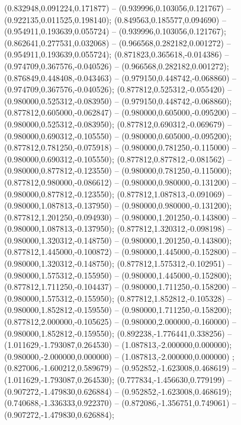  (0.832948,0.091224,0.171877) -- (0.939996,0.103056,0.121767) -- (0.922135,0.011525,0.198140);
 (0.849563,0.185577,0.094690) -- (0.954911,0.193639,0.055724) -- (0.939996,0.103056,0.121767);
 (0.862641,0.277531,0.032068) -- (0.966568,0.282182,0.001272) -- (0.954911,0.193639,0.055724);
 (0.871823,0.365618,-0.014386) -- (0.974709,0.367576,-0.040526) -- (0.966568,0.282182,0.001272);
 (0.876849,0.448408,-0.043463) -- (0.979150,0.448742,-0.068860) -- (0.974709,0.367576,-0.040526);
 (0.877812,0.525312,-0.055420) -- (0.980000,0.525312,-0.083950) -- (0.979150,0.448742,-0.068860);
 (0.877812,0.605000,-0.062847) -- (0.980000,0.605000,-0.095200) -- (0.980000,0.525312,-0.083950);
 (0.877812,0.690312,-0.069679) -- (0.980000,0.690312,-0.105550) -- (0.980000,0.605000,-0.095200);
 (0.877812,0.781250,-0.075918) -- (0.980000,0.781250,-0.115000) -- (0.980000,0.690312,-0.105550);
 (0.877812,0.877812,-0.081562) -- (0.980000,0.877812,-0.123550) -- (0.980000,0.781250,-0.115000);
 (0.877812,0.980000,-0.086612) -- (0.980000,0.980000,-0.131200) -- (0.980000,0.877812,-0.123550);
 (0.877812,1.087813,-0.091069) -- (0.980000,1.087813,-0.137950) -- (0.980000,0.980000,-0.131200);
 (0.877812,1.201250,-0.094930) -- (0.980000,1.201250,-0.143800) -- (0.980000,1.087813,-0.137950);
 (0.877812,1.320312,-0.098198) -- (0.980000,1.320312,-0.148750) -- (0.980000,1.201250,-0.143800);
 (0.877812,1.445000,-0.100872) -- (0.980000,1.445000,-0.152800) -- (0.980000,1.320312,-0.148750);
 (0.877812,1.575312,-0.102951) -- (0.980000,1.575312,-0.155950) -- (0.980000,1.445000,-0.152800);
 (0.877812,1.711250,-0.104437) -- (0.980000,1.711250,-0.158200) -- (0.980000,1.575312,-0.155950);
 (0.877812,1.852812,-0.105328) -- (0.980000,1.852812,-0.159550) -- (0.980000,1.711250,-0.158200);
 (0.877812,2.000000,-0.105625) -- (0.980000,2.000000,-0.160000) -- (0.980000,1.852812,-0.159550);
 (0.892238,-1.776441,0.338256) -- (1.011629,-1.793087,0.264530) -- (1.087813,-2.000000,0.000000);
 (0.980000,-2.000000,0.000000) -- (1.087813,-2.000000,0.000000) ;
 (0.827006,-1.600212,0.589679) -- (0.952852,-1.623008,0.468619) -- (1.011629,-1.793087,0.264530);
 (0.777834,-1.456630,0.779199) -- (0.907272,-1.479830,0.626884) -- (0.952852,-1.623008,0.468619);
 (0.740688,-1.336333,0.922370) -- (0.872086,-1.356751,0.749061) -- (0.907272,-1.479830,0.626884);
